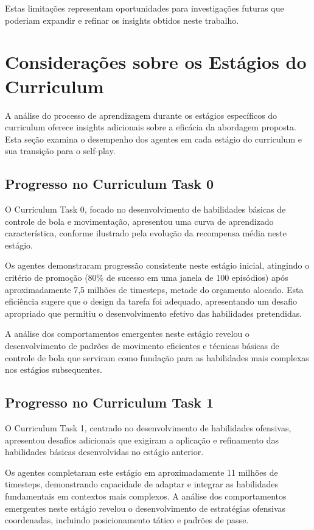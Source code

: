 Estas limitações representam oportunidades para investigações futuras que poderiam expandir e refinar os insights obtidos neste trabalho.

\section{Considerações sobre os Estágios do Curriculum}
\label{sec:analise_estagios}

A análise do processo de aprendizagem durante os estágios específicos do curriculum oferece insights adicionais sobre a eficácia da abordagem proposta. Esta seção examina o desempenho dos agentes em cada estágio do curriculum e sua transição para o self-play.

\subsection{Progresso no Curriculum Task 0}

O Curriculum Task 0, focado no desenvolvimento de habilidades básicas de controle de bola e movimentação, apresentou uma curva de aprendizado característica, conforme ilustrado pela evolução da recompensa média neste estágio.

Os agentes demonstraram progressão consistente neste estágio inicial, atingindo o critério de promoção (80\% de sucesso em uma janela de 100 episódios) após aproximadamente 7,5 milhões de timesteps, metade do orçamento alocado. Esta eficiência sugere que o design da tarefa foi adequado, apresentando um desafio apropriado que permitiu o desenvolvimento efetivo das habilidades pretendidas.

A análise dos comportamentos emergentes neste estágio revelou o desenvolvimento de padrões de movimento eficientes e técnicas básicas de controle de bola que serviram como fundação para as habilidades mais complexas nos estágios subsequentes.

\subsection{Progresso no Curriculum Task 1}

O Curriculum Task 1, centrado no desenvolvimento de habilidades ofensivas, apresentou desafios adicionais que exigiram a aplicação e refinamento das habilidades básicas desenvolvidas no estágio anterior.

Os agentes completaram este estágio em aproximadamente 11 milhões de timesteps, demonstrando capacidade de adaptar e integrar as habilidades fundamentais em contextos mais complexos. A análise dos comportamentos emergentes neste estágio revelou o desenvolvimento de estratégias ofensivas coordenadas, incluindo posicionamento tático e padrões de passe.

